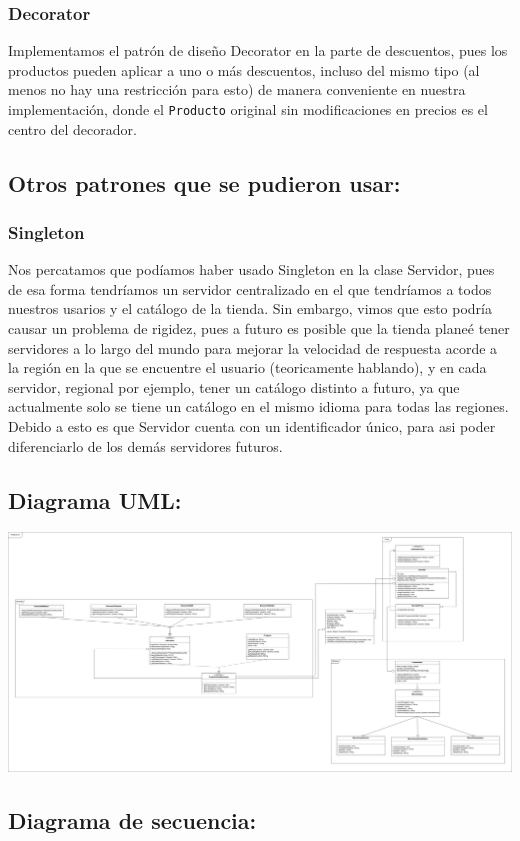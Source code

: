 \documentclass{article}
\newcommand{\code}[1]{\textcolor{white!25!black}{\texttt{#1}}}
\begin{document}
\subsubsection*{Decorator}
Implementamos el patrón de diseño Decorator en la parte de descuentos, pues los productos
pueden aplicar a uno o más descuentos, incluso del mismo tipo (al menos no hay una restricción
para esto) de manera conveniente en nuestra implementación, donde el \code{Producto} original
sin modificaciones en precios es el centro del decorador.

\subsection*{Otros patrones que se pudieron usar:}
\subsubsection*{Singleton}
Nos percatamos que podíamos haber usado Singleton en la clase Servidor, pues de esa forma
tendríamos un servidor centralizado en el que tendríamos a todos nuestros usarios y el catálogo
de la tienda. Sin embargo, vimos que esto podría causar un problema de rigidez, pues a futuro
es posible que la tienda planeé tener servidores a lo largo del mundo para mejorar la velocidad
de respuesta acorde a la región en la que se encuentre el usuario (teoricamente hablando), y
en cada servidor, regional por ejemplo, tener un catálogo distinto a futuro, ya que actualmente
solo se tiene un catálogo en el mismo idioma para todas las regiones. Debido a esto es que
Servidor cuenta con un identificador único, para asi poder diferenciarlo de los demás servidores
futuros.

\newpage
\subsection*{Diagrama UML:}
\begin{center}
  \includegraphics[scale=0.12]{./Proyecto01UML.jpg}
\end{center}

\subsection*{Diagrama de secuencia:}
\end{document}
